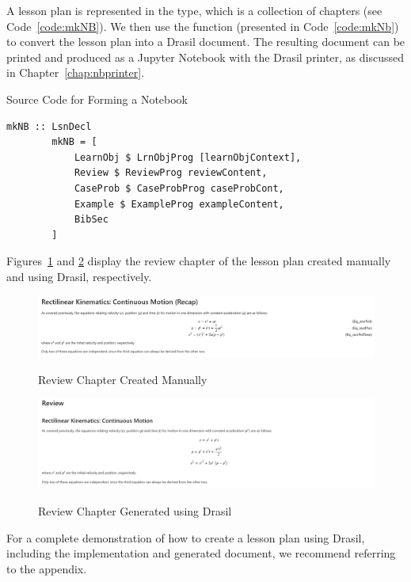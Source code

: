 A lesson plan is represented in the  type, which is a 
collection of chapters (see Code~\ref{code:mkNB}). We then use the 
 function (presented in Code~\ref{code:mkNb}) to convert the 
lesson plan into a Drasil document. The resulting document can be printed and 
produced as a Jupyter Notebook with the Drasil printer, as discussed in 
Chapter~\ref{chap:nbprinter}.

\begin{listing}[h!]
	\caption{Source Code for Forming a Notebook} 
	\label{code:mkNB}
	\begin{lstlisting}[language=haskell1]				
		mkNB :: LsnDecl
		mkNB = [
			LearnObj $ LrnObjProg [learnObjContext],
			Review $ ReviewProg reviewContent,
			CaseProb $ CaseProbProg caseProbCont,
			Example $ ExampleProg exampleContent,
			BibSec
		]
	\end{lstlisting}
\end{listing}

Figures~\ref{fig:review_byhand} and \ref{fig:review_drasil} display the 
review chapter of the lesson plan created manually and using Drasil, 
respectively.

\begin{figure}[h!]
	\caption{Review Chapter Created Manually}
	\includegraphics[width=1\textwidth]{figures/review_byhand.png}
	\label{fig:review_byhand}
\end{figure}

\begin{figure}[h!]
	\caption{Review Chapter Generated using Drasil}
	\includegraphics[width=1\textwidth]{figures/review_drasil.png}
	\label{fig:review_drasil}
\end{figure}

For a complete demonstration of how to create a lesson plan using Drasil, 
including the implementation and generated document, we recommend referring to 
the appendix. 
